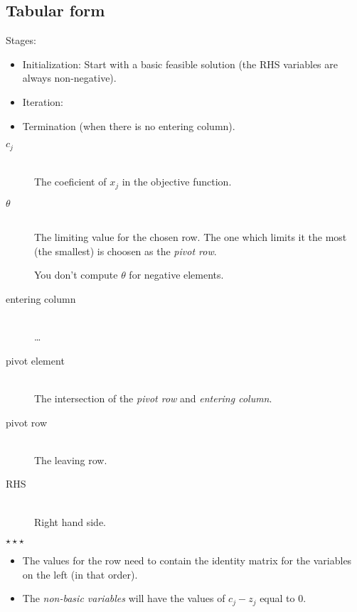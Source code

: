 \documentclass[12pt]{article}
\newcommand*\sepstars{%
  \begin{center}
    $\star\star\star$
  \end{center}
}
\begin{document}
\subsection{Tabular form}

Stages:

\begin{itemize}
    \item Initialization: Start with a basic feasible solution (the RHS
    variables are always non-negative).
    
    \item Iteration:
    
    \item Termination (when there is no entering column).
\end{itemize}

\begin{description}

\item[$c_j$] \hfill \\
    The coeficient of $x_j$ in the objective function.
    
\item[$\theta$] \hfill \\
    The limiting value for the chosen row. The one which limits it the most (the
    smallest) is choosen as the \emph{pivot row}.
    
    You don't compute $\theta$ for negative elements.
    
\item[entering column] \hfill \\
    \ldots
    
\item[pivot element] \hfill \\
    The intersection of the \emph{pivot row} and \emph{entering column}.
    
\item[pivot row] \hfill \\
    The leaving row.

\item[RHS] \hfill \\
    Right hand side.

\end{description}

\sepstars

\begin{itemize}
    \item The values for the row need to contain the identity matrix for the
    variables on the left (in that order).

    \item The \emph{non-basic variables} will have the values of $c_j - z_j$
    equal to 0.
\end{itemize}
\end{document}
